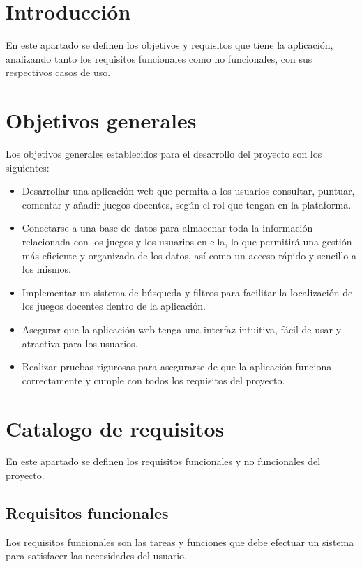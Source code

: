 
\section{Introducción}
En este apartado se definen los objetivos y requisitos que tiene la aplicación, analizando tanto los requisitos funcionales como no funcionales, con sus respectivos casos de uso.

\section{Objetivos generales}
Los objetivos generales establecidos para el desarrollo del proyecto son los siguientes:

\begin{itemize}
    \item Desarrollar una aplicación web que permita a los usuarios consultar, puntuar, comentar y añadir juegos docentes, según el rol que tengan en la plataforma.
    \item Conectarse a una base de datos para almacenar toda la información relacionada con los juegos y los usuarios en ella, lo que permitirá una gestión más eficiente y organizada de los datos, así como un acceso rápido y sencillo a los mismos.
    \item Implementar un sistema de búsqueda y filtros para facilitar la localización de los juegos docentes dentro de la aplicación.
    \item Asegurar que la aplicación web tenga una interfaz intuitiva, fácil de usar y atractiva para los usuarios.
    \item Realizar pruebas rigurosas para asegurarse de que la aplicación funciona correctamente y cumple con todos los requisitos del proyecto.
\end{itemize}

\section{Catalogo de requisitos}
En este apartado se definen los requisitos funcionales y no funcionales del proyecto.

\subsection{Requisitos funcionales}
Los requisitos funcionales son las tareas y funciones que debe efectuar un sistema para satisfacer las necesidades del usuario.

